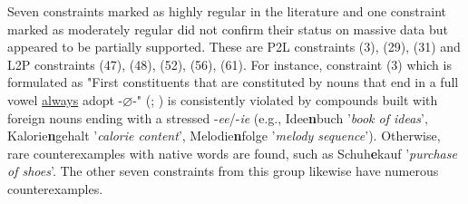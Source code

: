 \documentclass[10pt, a4paper]{article}
\newcommand{\zeroLinker}{\ensuremath{\boldsymbol{\varnothing}}}
\begin{document}
Seven constraints marked as highly regular in the literature and one constraint marked as moderately regular did not confirm their status on massive data but appeared to be partially supported. These are P2L constraints (3), (29), (31) and L2P constraints (47), (48), (52), (56), (61). For instance, constraint (3) which is formulated as "First constituents that are constituted by nouns that end in a full vowel \underline{always} adopt \mbox{-{\zeroLinker}-}" (\citealp[110]{kuerschner_2005}; \citealp[9]{schaefer_pankratz_2018}) is consistently violated by compounds built with foreign nouns ending with a stressed -\textit{ee}/-\textit{ie} (e.g., Idee\textbf{n}buch '\textit{book of ideas}', Kalorie\textbf{n}gehalt '\textit{calorie content}', Melodie\textbf{n}folge '\textit{melody sequence}'). Otherwise, rare counterexamples with native words are found, such as Schuh\textbf{e}kauf '\textit{purchase of shoes}'. The other seven constraints from this group likewise have numerous counterexamples.
\end{document}
